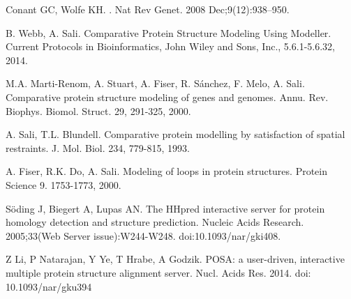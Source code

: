\documentclass[10pt,letterpaper]{article}
\begin{document}
%
%
% 
\begin{thebibliography}{10}

Conant GC, Wolfe KH.
.
\newblock Nat Rev Genet. 2008 Dec;9(12):938--950.

B. Webb, A. Sali.
\newblock Comparative Protein Structure Modeling Using Modeller.
\newblock Current Protocols in Bioinformatics, John Wiley and Sons, Inc., 5.6.1-5.6.32, 2014.

M.A. Marti-Renom, A. Stuart, A. Fiser, R. Sánchez, F. Melo, A. Sali. 
\newblock Comparative protein structure modeling of genes and genomes.
\newblock Annu. Rev. Biophys. Biomol. Struct. 29, 291-325, 2000.

A. Sali, T.L. Blundell.
\newblock Comparative protein modelling by satisfaction of spatial restraints.
\newblock J. Mol. Biol. 234, 779-815, 1993.

A. Fiser, R.K. Do, A. Sali.
\newblock Modeling of loops in protein structures.
\newblock Protein Science 9. 1753-1773, 2000.

Söding J, Biegert A, Lupas AN.
\newblock The HHpred interactive server for protein homology detection and structure prediction. 
\newblock Nucleic Acids Research. 2005;33(Web Server issue):W244-W248. doi:10.1093/nar/gki408.

Z Li, P Natarajan, Y Ye, T Hrabe, A Godzik.
\newblock POSA: a user-driven, interactive multiple protein structure alignment server.
\newblock Nucl. Acids Res. 2014. doi: 10.1093/nar/gku394

\end{thebibliography}
\end{document}

